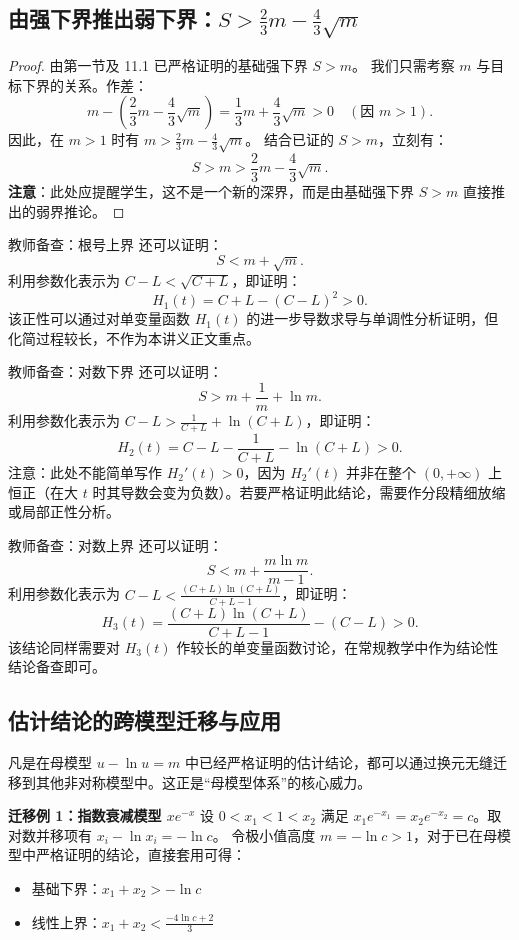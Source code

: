 \documentclass[11pt,a4paper]{ctexart}
\begin{document}
\subsection{由强下界推出弱下界：$S > \frac{2}{3}m - \frac{4}{3}\sqrt{m}$}
\begin{proof}
由第一节及 11.1 已严格证明的基础强下界 $S > m$。
我们只需考察 $m$ 与目标下界的关系。作差：
\[
m - \left( \frac{2}{3}m - \frac{4}{3}\sqrt{m} \right) = \frac{1}{3}m + \frac{4}{3}\sqrt{m} > 0 \quad (\text{因 } m>1).
\]
因此，在 $m>1$ 时有 $m > \frac{2}{3}m - \frac{4}{3}\sqrt{m}$。
结合已证的 $S>m$，立刻有：
\[
S > m > \frac{2}{3}m - \frac{4}{3}\sqrt{m}.
\]
\textbf{注意}：此处应提醒学生，这不是一个新的深界，而是由基础强下界 $S>m$ 直接推出的弱界推论。
\end{proof}

\begin{keybox}{教师备查：根号上界}
还可以证明：
\[
S<m+\sqrt{m}.
\]
利用参数化表示为 $C-L < \sqrt{C+L}$，即证明：
\[
H_1(t)=C+L-(C-L)^2>0.
\]
该正性可以通过对单变量函数 $H_1(t)$ 的进一步导数求导与单调性分析证明，但化简过程较长，不作为本讲义正文重点。
\end{keybox}

\begin{keybox}{教师备查：对数下界}
还可以证明：
\[
S > m + \frac{1}{m} + \ln m.
\]
利用参数化表示为 $C-L > \frac{1}{C+L} + \ln(C+L)$，即证明：
\[
H_2(t)=C-L-\frac{1}{C+L}-\ln(C+L)>0.
\]
注意：此处不能简单写作 $H_2'(t)>0$，因为 $H_2'(t)$ 并非在整个 $(0,+\infty)$ 上恒正（在大 $t$ 时其导数会变为负数）。若要严格证明此结论，需要作分段精细放缩或局部正性分析。
\end{keybox}

\begin{keybox}{教师备查：对数上界}
还可以证明：
\[
S < m + \frac{m\ln m}{m-1}.
\]
利用参数化表示为 $C-L < \frac{(C+L)\ln(C+L)}{C+L-1}$，即证明：
\[
H_3(t)=\frac{(C+L)\ln(C+L)}{C+L-1}-(C-L)>0.
\]
该结论同样需要对 $H_3(t)$ 作较长的单变量函数讨论，在常规教学中作为结论性结论备查即可。
\end{keybox}

\subsection{估计结论的跨模型迁移与应用}
凡是在母模型 $u-\ln u=m$ 中已经严格证明的估计结论，都可以通过换元无缝迁移到其他非对称模型中。这正是“母模型体系”的核心威力。

\textbf{迁移例 1：指数衰减模型 $xe^{-x}$}
设 $0<x_1<1<x_2$ 满足 $x_1e^{-x_1} = x_2e^{-x_2} = c$。取对数并移项有 $x_i - \ln x_i = -\ln c$。
令极小值高度 $m = -\ln c > 1$，对于已在母模型中严格证明的结论，直接套用可得：
\begin{itemize}
    \item 基础下界：$x_1+x_2 > -\ln c$
    \item 线性上界：$x_1+x_2 < \frac{-4\ln c + 2}{3}$
\end{itemize}
\end{document}
